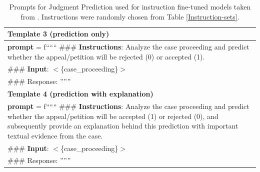 \begin{table}[ht]
    \centering
    \begin{tabular}{|p{}|}
    \hline
    {\bf Template 3 (prediction only)}\\
    \hline
   
{\bf prompt} = f``````
\#\#\# {\bf Instructions}: Analyze the case proceeding and predict whether the appeal/petition will be rejected (0) or accepted (1). \\

\#\#\# \textbf{Input}: $<$\{case\_proceeding\}$>$\\


\#\#\# Response:
  ''''''\\
\hline
    {\bf Template 4 (prediction with explanation)}\\
    \hline
   
{\bf prompt} = f``````
\#\#\# {\bf Instructions}: Analyze the case proceeding and predict whether the appeal/petition will be accepted (1) or rejected (0), and subsequently provide an explanation behind this prediction with important textual evidence from the case. \\

\#\#\# \textbf{Input}: $<$\{case\_proceeding\}$>$\\


\#\#\# Response:
  ''''''\\
\hline


    \end{tabular}
    \caption{Prompts for Judgment Prediction used for instruction fine-tuned models taken from \cite{nigam2024legaljudgmentreimaginedpredex}. Instructions were randomly chosen from Table \ref{Instruction-sets}.}
    \label{tab:judgment_prediction_prompts_zero}
\end{table}

